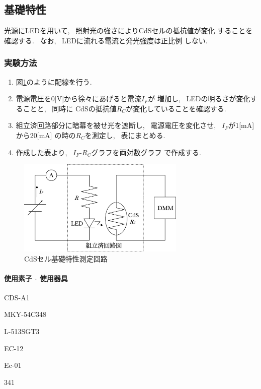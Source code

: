 \documentclass[titlepage]{jsarticle}
\begin{document}
    \subsection{基礎特性}
        光源にLEDを用いて, ~照射光の強さによりCdSセルの抵抗値が変化
        することを確認する. ~なお, ~LEDに流れる電流と発光強度は正比例
        しない.

        \subsubsection{実験方法}
            \begin{enumerate}
                \item 図\ref{fig:基礎特性}のように配線を行う.
                \item 電源電圧を0[V]から徐々にあげると電流$I_F$が
                    増加し, ~LEDの明るさが変化することと, ~同時に
                    CdSの抵抗値$R_C$が変化していることを確認する.
                \item 組立済回路部分に暗幕を被せ光を遮断し,
                    ~電源電圧を変化させ, ~$I_F$が1[mA]から20[mA]
                    の時の$R_C$を測定し, ~表にまとめる.
                \item 作成した表より, ~$I_F$-$R_C$グラフを両対数グラフ
                    で作成する.
            \end{enumerate}

            \begin{figure}[ht]
                \centering
                \includegraphics[width=8cm]{images/CdS_circuit.eps}
                \caption{CdSセル基礎特性測定回路}
                \label{fig:基礎特性}
            \end{figure}

            \paragraph{使用素子 $\cdot$ 使用器具}
                \begin{description}
                    \setlength{\leftskip}{1.5em}
                    \item[組立済回路] CDS-A1
                    \item[CdSセル] MKY-54C348
                    \item[LED] L-513SGT3
                    \item[デジタルマルチメータ] EC-12
                    \item[直流電源] Ec-01
                    \item[電流計] 341 
                \end{description}
                
\end{document}
